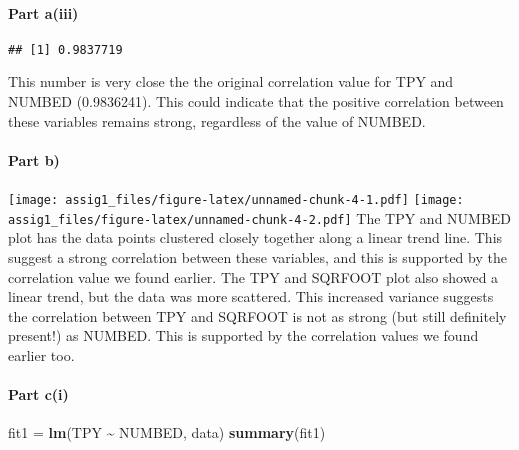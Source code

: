 \documentclass[
]{article}
\newenvironment{Shaded}{\begin{snugshade}}{\end{snugshade}}
\newcommand{\DecValTok}[1]{\textcolor[rgb]{0.00,0.00,0.81}{#1}}
\newcommand{\FunctionTok}[1]{\textcolor[rgb]{0.13,0.29,0.53}{\textbf{#1}}}
\newcommand{\NormalTok}[1]{#1}
\newcommand{\OtherTok}[1]{\textcolor[rgb]{0.56,0.35,0.01}{#1}}
\newcommand{\SpecialCharTok}[1]{\textcolor[rgb]{0.81,0.36,0.00}{\textbf{#1}}}
\begin{document}
\hypertarget{part-aiii}{%
\paragraph{Part a(iii)}\label{part-aiii}}

\begin{Shaded}
\end{Shaded}

\begin{verbatim}
## [1] 0.9837719
\end{verbatim}

This number is very close the the original correlation value for TPY and
NUMBED (0.9836241). This could indicate that the positive correlation
between these variables remains strong, regardless of the value of
NUMBED.

\hypertarget{part-b}{%
\paragraph{Part b)}\label{part-b}}

\texttt{[image: assig1\_files/figure-latex/unnamed-chunk-4-1.pdf]}
\texttt{[image: assig1\_files/figure-latex/unnamed-chunk-4-2.pdf]} The
TPY and NUMBED plot has the data points clustered closely together along
a linear trend line. This suggest a strong correlation between these
variables, and this is supported by the correlation value we found
earlier. The TPY and SQRFOOT plot also showed a linear trend, but the
data was more scattered. This increased variance suggests the
correlation between TPY and SQRFOOT is not as strong (but still
definitely present!) as NUMBED. This is supported by the correlation
values we found earlier too.

\hypertarget{part-ci}{%
\paragraph{Part c(i)}\label{part-ci}}

\begin{Shaded}
\begin{Highlighting}[]
\NormalTok{fit1 }\OtherTok{=} \FunctionTok{lm}\NormalTok{(TPY }\SpecialCharTok{\textasciitilde{}}\NormalTok{ NUMBED, data)}
\FunctionTok{summary}\NormalTok{(fit1)}
\end{Highlighting}
\end{Shaded}
\end{document}
